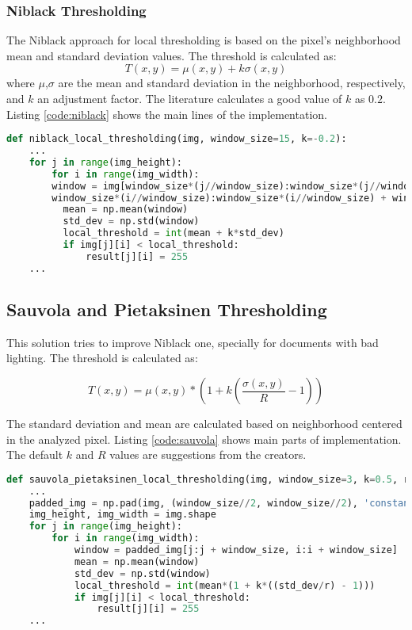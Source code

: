 \documentclass[]{IEEEtran}
\begin{document}
\subsubsection{Niblack Thresholding}
The Niblack approach for local thresholding is based on the pixel's neighborhood mean and standard deviation values. The threshold is calculated as:
\begin{equation}
  T(x, y) = \mu(x, y) + k\sigma(x,y) 
\end{equation}
where $\mu$,$\sigma$ are the mean and standard deviation in the neighborhood, respectively, and $k$ an adjustment factor. The literature calculates a good value of $k$ as $0.2$. Listing \ref{code:niblack} shows the main lines of the implementation.

\begin{lstlisting}[language=Python, caption={Niblack Local Thresholding Implementation}, label={code:niblack}]
  def niblack_local_thresholding(img, window_size=15, k=-0.2):
    ...
    for j in range(img_height):
        for i in range(img_width):
        window = img[window_size*(j//window_size):window_size*(j//window_size) + window_size,
        window_size*(i//window_size):window_size*(i//window_size) + window_size]
          mean = np.mean(window)
          std_dev = np.std(window)
          local_threshold = int(mean + k*std_dev)
          if img[j][i] < local_threshold:
              result[j][i] = 255
    ...
\end{lstlisting}

\subsection{Sauvola and Pietaksinen Thresholding}
This solution tries to improve Niblack one, specially for documents with bad lighting. The threshold is calculated as:

\begin{equation}
  T(x,y) = \mu (x,y)*(1 + k(\dfrac{\sigma(x,y)}{R} - 1))
\end{equation}

The standard deviation and mean are calculated based on neighborhood centered in the analyzed pixel. Listing \ref{code:sauvola} shows main parts of implementation. The default $k$ and $R$ values are suggestions from the creators.

\begin{lstlisting}[language=Python, caption={Sauvola and Pietaksinen Local Thresholding Implementation}, label={code:sauvola}]
  def sauvola_pietaksinen_local_thresholding(img, window_size=3, k=0.5, r=128):
    ...
    padded_img = np.pad(img, (window_size//2, window_size//2), 'constant')
    img_height, img_width = img.shape
    for j in range(img_height):
        for i in range(img_width):
            window = padded_img[j:j + window_size, i:i + window_size]
            mean = np.mean(window)
            std_dev = np.std(window)
            local_threshold = int(mean*(1 + k*((std_dev/r) - 1)))
            if img[j][i] < local_threshold:
                result[j][i] = 255
    ...
\end{lstlisting}
\end{document}
